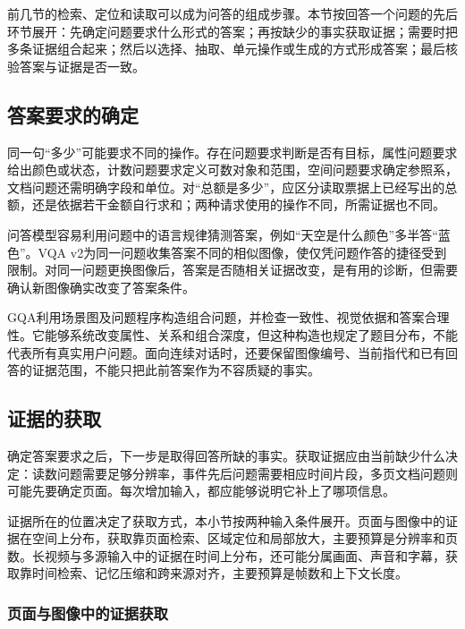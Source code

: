 前几节的检索、定位和读取可以成为问答的组成步骤。本节按回答一个问题的先后环节展开：先确定问题要求什么形式的答案；再按缺少的事实获取证据；需要时把多条证据组合起来；然后以选择、抽取、单元操作或生成的方式形成答案；最后核验答案与证据是否一致。

\subsection{答案要求的确定}
\label{sec:vision-understanding-question}

同一句“多少”可能要求不同的操作。存在问题要求判断是否有目标，属性问题要求给出颜色或状态，计数问题要求定义可数对象和范围，空间问题要求确定参照系，文档问题还需明确字段和单位。对“总额是多少”，应区分读取票据上已经写出的总额，还是依据若干金额自行求和；两种请求使用的操作不同，所需证据也不同。

问答模型容易利用问题中的语言规律猜测答案，例如“天空是什么颜色”多半答“蓝色”。VQA v2为同一问题收集答案不同的相似图像，使仅凭问题作答的捷径受到限制。对同一问题更换图像后，答案是否随相关证据改变，是有用的诊断，但需要确认新图像确实改变了答案条件。

GQA利用场景图及问题程序构造组合问题，并检查一致性、视觉依据和答案合理性。它能够系统改变属性、关系和组合深度，但这种构造也规定了题目分布，不能代表所有真实用户问题。面向连续对话时，还要保留图像编号、当前指代和已有回答的证据范围，不能只把此前答案作为不容质疑的事实。

\subsection{证据的获取}
\label{sec:vision-understanding-evidence}

确定答案要求之后，下一步是取得回答所缺的事实。获取证据应由当前缺少什么决定：读数问题需要足够分辨率，事件先后问题需要相应时间片段，多页文档问题则可能先要确定页面。每次增加输入，都应能够说明它补上了哪项信息。

证据所在的位置决定了获取方式，本小节按两种输入条件展开。页面与图像中的证据在空间上分布，获取靠页面检索、区域定位和局部放大，主要预算是分辨率和页数。长视频与多源输入中的证据在时间上分布，还可能分属画面、声音和字幕，获取靠时间检索、记忆压缩和跨来源对齐，主要预算是帧数和上下文长度。

\subsubsection{页面与图像中的证据获取}
\label{sec:vision-understanding-evidence-composition}

